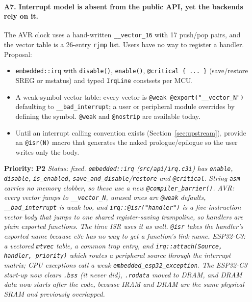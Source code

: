 \documentclass[11pt,a4paper]{article}
\newcommand{\pkg}[1]{\texttt{#1}}
\newcommand{\prio}[1]{\textbf{Priority: #1}}
\begin{document}
\paragraph{A7. Interrupt model is absent from the public API, yet the backends rely on it.}
The AVR clock uses a hand-written \pkg{\_\_vector\_16} with 17 push/pop pairs, and the vector
table is a 26-entry \pkg{rjmp} list. Users have no way to register a handler. Proposal:
\begin{itemize}
  \item \pkg{embedded::irq} with \pkg{disable()}, \pkg{enable()}, \pkg{@critical \{ ... \}} (save/restore
        SREG or mstatus) and typed \pkg{IrqLine} constsets per MCU.
  \item A weak-symbol vector table: every vector is \pkg{@weak @export("\_\_vector\_N")} defaulting to
        \pkg{\_\_bad\_interrupt}; a user or peripheral module overrides by defining the symbol.
        \pkg{@weak} and \pkg{@nostrip} are available today.
  \item Until an interrupt calling convention exists (Section~\ref{sec:upstream}), provide an
        \pkg{@isr(N)} macro that generates the naked prologue/epilogue so the user writes only the body.
\end{itemize}
\prio{P2}
\textit{Status: fixed. \pkg{embedded::irq} (\pkg{src/api/irq.c3i}) has \pkg{enable}, \pkg{disable}, \pkg{is\_enabled}, \pkg{save\_and\_disable}/\pkg{restore} and \pkg{@critical}. String \pkg{asm} carries no memory clobber, so these use a new \pkg{@compiler\_barrier()}. AVR: every vector jumps to \pkg{\_\_vector\_N}, unused ones are \pkg{@weak} defaults, \pkg{\_\_bad\_interrupt} is weak too, and \pkg{irq::@isr("handler")} is a five-instruction vector body that jumps to one shared register-saving trampoline, so handlers are plain exported functions. The time ISR uses it as well. \pkg{@isr} takes the handler's exported name because c3c has no way to get a function's link name. ESP32-C3: a vectored \pkg{mtvec} table, a common trap entry, and \pkg{irq::attach(Source, handler, priority)} which routes a peripheral source through the interrupt matrix; CPU exceptions call a weak \pkg{embedded\_esp32\_exception}. The ESP32-C3 start-up now clears \pkg{.bss} (it never did), \pkg{.rodata} moved to DRAM, and DRAM data now starts after the code, because IRAM and DRAM are the same physical SRAM and previously overlapped.}
\end{document}
